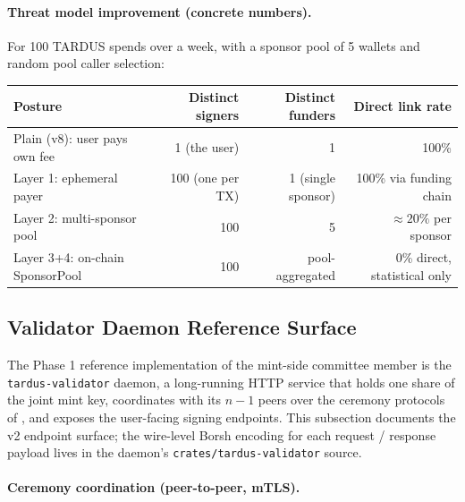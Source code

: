 \paragraph{Threat model improvement (concrete numbers).} For 100
TARDUS spends over a week, with a sponsor pool of 5 wallets and
random pool caller selection:

\begin{center}
\small
\begin{tabular}{lrrr}
\toprule
Posture & Distinct signers & Distinct funders & Direct link rate \\
\midrule
Plain (v8): user pays own fee     & 1 (the user)         & 1                  & 100\% \\
Layer 1: ephemeral payer          & 100 (one per TX)     & 1 (single sponsor) & 100\% via funding chain \\
Layer 2: multi-sponsor pool       & 100                  & 5                  & $\approx 20\%$ per sponsor \\
Layer 3+4: on-chain SponsorPool   & 100                  & pool-aggregated    & 0\% direct, statistical only \\
\bottomrule
\end{tabular}
\end{center}

\subsection{Validator Daemon Reference Surface}
\label{sec:mint-validator-daemon}

The Phase 1 reference implementation of the mint-side committee
member is the \texttt{tardus-validator} daemon, a long-running HTTP
service that holds one share of the joint mint key, coordinates with
its $n-1$ peers over the ceremony protocols of
, and exposes
the user-facing signing endpoints. This subsection documents the
v2 endpoint surface; the wire-level Borsh encoding for each request
/ response payload lives in the daemon's
\texttt{crates/tardus-validator} source.

\paragraph{Ceremony coordination (peer-to-peer, mTLS).}

